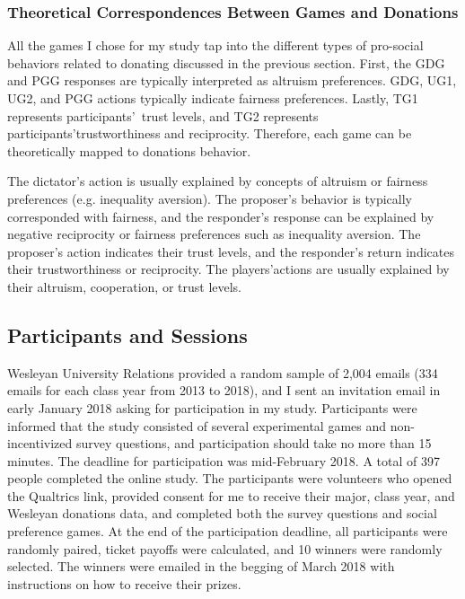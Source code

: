 \documentclass[12pt]{article}
\begin{document}
\subsubsection{Theoretical Correspondences Between Games and Donations}

{\color{blue}All the games I chose for my study tap into the different types of pro-social behaviors related to donating discussed in the previous section. First, the GDG and PGG responses are typically interpreted as altruism preferences. GDG, UG1, UG2, and PGG actions typically indicate fairness preferences. Lastly, TG1 represents participants\rq \ trust levels, and TG2 represents participants\rq trustworthiness and reciprocity. Therefore, each game can be theoretically mapped to donations behavior.


The dictator\rq s action is usually explained by concepts of altruism or fairness preferences (e.g. inequality aversion).
The proposer\rq s behavior is typically corresponded with fairness, and the responder\rq s response can be explained by negative reciprocity or fairness preferences such as inequality aversion.
The proposer\rq s action indicates their trust levels, and the responder\rq s return indicates their trustworthiness or reciprocity.
The players\rq actions are usually explained by their altruism, cooperation, or trust levels.
}




	
\subsection{Participants and Sessions}

Wesleyan University Relations provided a random sample of 2,004 emails (334 emails for each class year from 2013 to 2018), and I sent an invitation email in early January 2018 asking for participation in my study. Participants were informed that the study consisted of several experimental games and non-incentivized survey questions, and participation should take no more than 15 minutes.  The deadline for participation was mid-February 2018. A total of 397 people completed the online study. The participants were volunteers who opened the Qualtrics link, provided consent for me to receive their major, class year, and Wesleyan donations data, and completed both the survey questions and social preference games. At the end of the participation deadline, all participants were randomly paired, ticket payoffs were calculated, and 10 winners were randomly selected. The winners were emailed  in the begging of March 2018 with instructions on how to receive their prizes.
\end{document}
